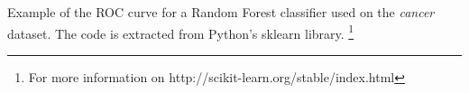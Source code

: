 Example of the ROC curve for a Random Forest classifier used on the \textit{cancer} dataset.  The code is extracted from Python's sklearn library. \footnote{For more information on 
http://scikit-learn.org/stable/index.html}